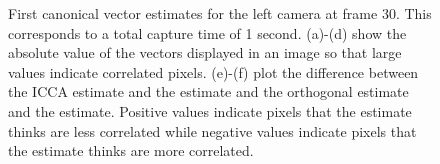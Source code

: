 \begin{figure}
\begin{center}
{    }
    \caption{First canonical vector estimates for the left camera at frame 30. This corresponds
      to a total capture time of 1 second. (a)-(d) show the absolute value of the
      vectors displayed in an image so that large values indicate correlated
      pixels. (e)-(f) plot the difference between the ICCA estimate and the \iccap
      estimate and the orthogonal estimate and the \iccap estimate. Positive values
      indicate pixels that the \iccap estimate thinks are less correlated while negative
      values indicate pixels that the \iccap estimate thinks are more correlated. }
    \label{fig:chpt5:flashing3_1}
  \end{center}
\end{figure}

